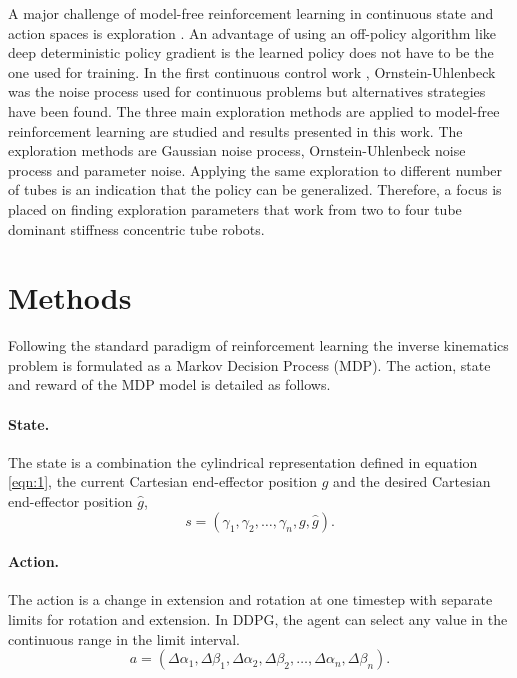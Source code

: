A major challenge of model-free reinforcement learning in continuous state and action spaces is exploration \cite{Nair2018}. An advantage of using an off-policy algorithm like deep deterministic policy gradient is the learned policy does not have to be the one used for training. In the first continuous control work \cite{Lillicrap2015}, Ornstein-Uhlenbeck was the noise process used for continuous problems but alternatives strategies have been found. The three main exploration methods are applied to model-free reinforcement learning are studied and results presented in this work. The exploration methods are Gaussian noise process, Ornstein-Uhlenbeck noise process and parameter noise. Applying the same exploration to different number of tubes is an indication that the policy can be generalized. Therefore, a focus is placed on finding exploration parameters that work from two to four tube dominant stiffness concentric tube robots.
\section{Methods}
Following the standard paradigm of reinforcement learning the inverse kinematics problem is formulated as a Markov Decision Process (MDP). The action, state and reward of the MDP model is detailed as follows.

\paragraph{State.} The state is a combination the cylindrical representation defined in equation \ref{eqn:1}, the current Cartesian end-effector position $g$ and the desired Cartesian end-effector position $\hat{g}$,
\begin{equation}
s = \left( \gamma_1, \gamma_2, \dots, \gamma_n, g, \hat{g} \right). \label{eqn:5}
\end{equation}

\paragraph{Action.} The action is a change in extension and rotation at one timestep with separate limits for rotation and extension. In DDPG, the agent can select any value in the continuous range in the limit interval.
\begin{equation}
a = \left( \Delta \alpha_1, \Delta \beta_1, \Delta \alpha_2, \Delta \beta_2,  \dots, \Delta \alpha_n, \Delta \beta_n \right). \label{eqn:6}
\end{equation}

